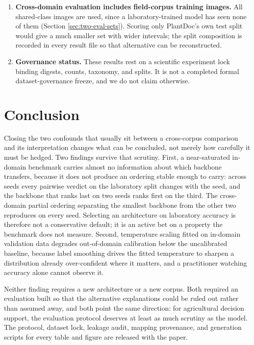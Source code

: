 \documentclass[runningheads]{llncs}
\begin{document}
\begin{enumerate}
\item \textbf{Cross-domain evaluation includes field-corpus training images.}
All \NXdImages{} shared-class images are used, since a laboratory-trained model
has seen none of them (Section \ref{sec:two-eval-sets}). Scoring only PlantDoc's
own test split would give a much smaller set with wider intervals; the split
composition is recorded in every result file so that alternative can be
reconstructed.

\item \textbf{Governance status.} These results rest on a scientific experiment
lock binding digests, counts, taxonomy, and splits. It is not a completed formal
dataset-governance freeze, and we do not claim otherwise.
\end{enumerate}

\section{Conclusion}

Closing the two confounds that usually sit between a cross-corpus comparison and
its interpretation changes what can be concluded, not merely how carefully it
must be hedged. Two findings survive that scrutiny. First, a near-saturated in-domain benchmark
carries almost no information about which backbone transfers, because it does not
produce an ordering stable enough to carry: across \NSeedsDone{} seeds every
pairwise verdict on the laboratory split changes with the seed, and the backbone
that ranks last on two seeds ranks first on the third. The cross-domain partial
ordering separating the smallest backbone from the other two reproduces on every
seed. Selecting an architecture on laboratory accuracy is therefore not a
conservative default; it is an active bet on a property the benchmark does not
measure. Second, temperature scaling fitted on in-domain validation data degrades
out-of-domain calibration below the uncalibrated baseline, because label
smoothing drives the fitted temperature to sharpen a distribution already
over-confident where it matters, and a practitioner watching accuracy alone
cannot observe it.

Neither finding requires a new architecture or a new corpus. Both required an
evaluation built so that the alternative explanations could be ruled out rather
than assumed away, and both point the same direction: for agricultural decision
support, the evaluation protocol deserves at least as much scrutiny as the model.
The protocol, dataset lock, leakage audit, mapping provenance, and generation
scripts for every table and figure are released with the paper.
\end{document}
